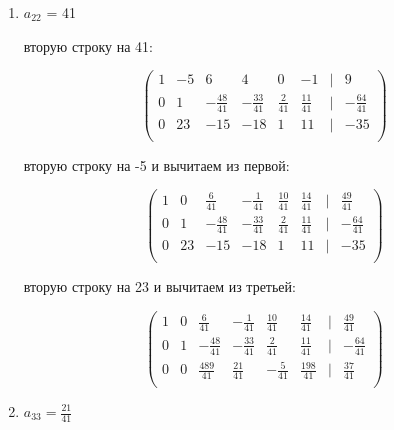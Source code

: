 \documentclass{report}
\begin{document}
\begin{itemize}
\begin{enumerate}
\begin{itemize}
			\end{itemize}
			
			
			\item{$a_{22}$ = 41}
			
			\begin{itemize}
				 вторую строку на 41:
				
				\begin{center}
					\Large{
						\[
						\begin{pmatrix}
							1 & -5 & 6 & 4 & 0 & -1 & | & 9 \\
							0 & 1 & -\frac{48}{41} & -\frac{33}{41} & \frac{2}{41} & \frac{11}{41} & | & -\frac{64}{41} \\
							0 & 23 & -15 & -18 & 1 & 11 & | & -35 \\
						\end{pmatrix}
						\]
					}
				\end{center}
				
				 вторую строку на -5 и вычитаем из первой:
				
				\begin{center}
					\Large{
						\[
						\begin{pmatrix}
							1 & 0 & \frac{6}{41} & -\frac{1}{41} & \frac{10}{41} & \frac{14}{41} & | & \frac{49}{41} \\
							0 & 1 & -\frac{48}{41} & -\frac{33}{41} & \frac{2}{41} & \frac{11}{41} & | & -\frac{64}{41} \\
							0 & 23 & -15 & -18 & 1 & 11 & | & -35 \\
						\end{pmatrix}
						\]
					}
				\end{center}
				
				 вторую строку на 23 и вычитаем из третьей:
				
				\begin{center}
					\Large{
						\[
						\begin{pmatrix}
							1 & 0 & \frac{6}{41} & -\frac{1}{41} & \frac{10}{41} & \frac{14}{41} & | & \frac{49}{41} \\
							0 & 1 & -\frac{48}{41} & -\frac{33}{41} & \frac{2}{41} & \frac{11}{41} & | & -\frac{64}{41} \\
							0 & 0 & \frac{489}{41} & \frac{21}{41} & -\frac{5}{41} & \frac{198}{41} & | & \frac{37}{41} \\
						\end{pmatrix}
						\]
					}
				\end{center}
			\end{itemize}
			\item{$a_{33}=\frac{21}{41}$}
			

\end{enumerate}
\end{itemize}
\end{document}

